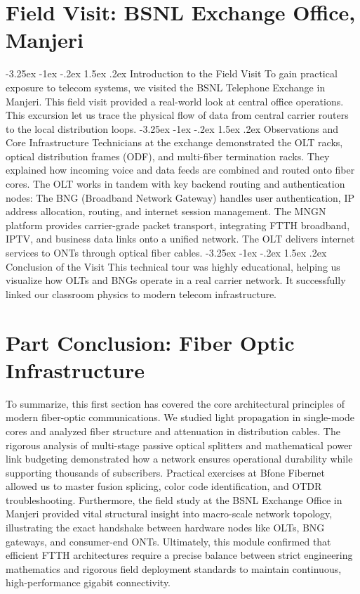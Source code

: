 \documentclass[11pt,a4paper]{report}
\makeatletter
\renewcommand{\section}{\@startsection{section}{1}{\z@}%
  {-3.25ex \@plus -1ex \@minus -.2ex}%
  {1.5ex \@plus.2ex}%
  {\normalfont\Large\bfseries\color{primaryColor}}}
\makeatother
\begin{document}
\chapter{Field Visit: BSNL Exchange Office, Manjeri}
\section{Introduction to the Field Visit}
To gain practical exposure to telecom systems, we visited the BSNL Telephone Exchange in Manjeri. This field visit provided a real-world look at central office operations. This excursion let us trace the physical flow of data from central carrier routers to the local distribution loops.
\section{Observations and Core Infrastructure}
Technicians at the exchange demonstrated the OLT racks, optical distribution frames (ODF), and multi-fiber termination racks. They explained how incoming voice and data feeds are combined and routed onto fiber cores. The OLT works in tandem with key backend routing and authentication nodes: The BNG (Broadband Network Gateway) handles user authentication, IP address allocation, routing, and internet session management. The MNGN platform provides carrier-grade packet transport, integrating FTTH broadband, IPTV, and business data links onto a unified network. The OLT delivers internet services to ONTs through optical fiber cables.
\section{Conclusion of the Visit}
This technical tour was highly educational, helping us visualize how OLTs and BNGs operate in a real carrier network. It successfully linked our classroom physics to modern telecom infrastructure.
\chapter*{Part Conclusion: Fiber Optic Infrastructure}
To summarize, this first section has covered the core architectural principles of modern fiber-optic communications. We studied light propagation in single-mode cores and analyzed fiber structure and attenuation in distribution cables. The rigorous analysis of multi-stage passive optical splitters and mathematical power link budgeting demonstrated how a network ensures operational durability while supporting thousands of subscribers. Practical exercises at Bfone Fibernet allowed us to master fusion splicing, color code identification, and OTDR troubleshooting. Furthermore, the field study at the BSNL Exchange Office in Manjeri provided vital structural insight into macro-scale network topology, illustrating the exact handshake between hardware nodes like OLTs, BNG gateways, and consumer-end ONTs. Ultimately, this module confirmed that efficient FTTH architectures require a precise balance between strict engineering mathematics and rigorous field deployment standards to maintain continuous, high-performance gigabit connectivity.
\end{document}
